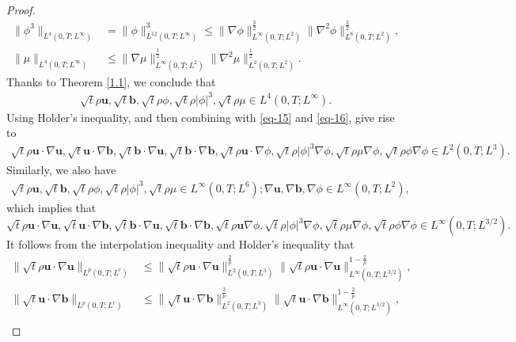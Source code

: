 \documentclass[10pt,a4paper]{amsart}
\begin{document}
\begin{proof}
\begin{align*}
\|\phi^3\|_{L^4(0,T;L^\infty)}&=\|\phi\|^3_{L^{12}(0,T;L^\infty)}\leq \|\nabla \phi\|_{L^\infty(0,T;L^2)}^{\frac{3}{2}} \|\nabla^2 \phi\|_{L^{6}(0,T;L^2)}^{\frac{3}{2}},\\
\|\mu\|_{L^4(0,T;L^\infty)} &\leq \|\nabla \mu\|_{L^\infty(0,T;L^2)}^{\frac{1}{2}} \|\nabla^2 \mu\|_{L^2(0,T;L^2)}^{\frac{1}{2}}.
\end{align*}
Thanks to Theorem  \ref{1.1}, we conclude that
\begin{align}
\sqrt{t}\rho \mathbf{u}, \sqrt{t} \mathbf{b}, \sqrt{t}\rho \phi,\sqrt{t}\rho |\phi|^3,\sqrt{t}\rho \mu\in L^4(0,T;L^\infty).
\end{align}
Using Holder's inequality, and then combining with \eqref{eq-15} and \eqref{eq-16}, give rise to
\begin{align*}
\sqrt{t}\rho \mathbf{u} \cdot \nabla \mathbf{u}, \sqrt{t}\mathbf{u} \cdot \nabla \mathbf{b}, \sqrt{t}\mathbf{b} \cdot \nabla \mathbf{u}, \sqrt{t}\mathbf{b} \cdot \nabla \mathbf{b}, \sqrt{t}\rho \mathbf{u}\cdot  \nabla \phi,\sqrt{t}\rho |\phi|^3\nabla \phi,\sqrt{t}\rho \mu  \nabla \phi,\sqrt{t}\rho\phi\nabla \phi \in L^2(0,T;L^3).
\end{align*}
Similarly, we also have
\begin{align*}
\sqrt{t}\rho \mathbf{u}, \sqrt{t}\mathbf{b}, \sqrt{t}\rho \phi,\sqrt{t}\rho |\phi|^3,\sqrt{t}\rho\mu\in L^\infty(0,T;L^6);
\nabla \mathbf{u}, \nabla \mathbf{b}, \nabla \phi \in L^\infty(0,T;L^2),
\end{align*}
which implies that
\begin{equation*}
\sqrt{t}\rho \mathbf{u}\cdot \nabla\mathbf{u}, \sqrt{t}\mathbf{u} \cdot \nabla \mathbf{b}, \sqrt{t}\mathbf{b} \cdot \nabla \mathbf{u}, \sqrt{t}\mathbf{b} \cdot \nabla \mathbf{b}, \sqrt{t}\rho \mathbf{u} \nabla \phi ,\sqrt{t}\rho |\phi|^3\nabla \phi,\sqrt{t}\rho \mu \nabla \phi,\sqrt{t}\rho\phi\nabla \phi\in L^\infty(0, T; L^{3/2}).
\end{equation*}
It follows from the interpolation inequality and Holder's inequality that
\begin{align*}
\|\sqrt{t}\rho \mathbf{u} \cdot \nabla \mathbf{u}\|_{L^p(0,T;L^r)} &\leq \|\sqrt{t}\rho \mathbf{u} \cdot \nabla \mathbf{u}\|_{L^2(0,T;L^3)}^{\frac{2}{p}} \|\sqrt{t}\rho \mathbf{u} \cdot \nabla \mathbf{u}\|_{L^\infty(0,T;L^{3/2})}^{1 - \frac{2}{p}}, \\
\|\sqrt{t}\mathbf{u} \cdot \nabla \mathbf{b}\|_{L^p(0,T;L^r)} &\leq \|\sqrt{t} \mathbf{u} \cdot \nabla \mathbf{b}\|_{L^2(0,T;L^3)}^{\frac{2}{p}} \|\sqrt{t} \mathbf{u} \cdot \nabla \mathbf{b}\|_{L^\infty(0,T;L^{3/2})}^{1 - \frac{2}{p}}, \\

\end{align*}
\end{proof}
\end{document}
